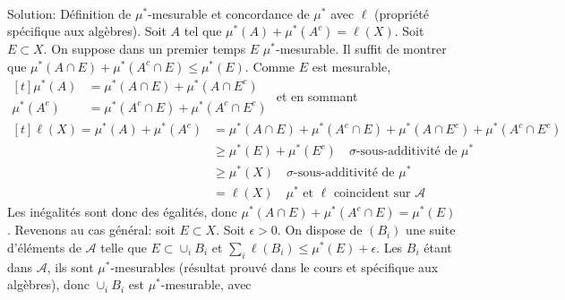\documentclass{report}
\begin{document}
\newpage 
\subsection{} \\ \\

Solution:\newline
\fbox{$\Rightarrow$} Définition de $\mu^*$-mesurable et concordance de $\mu^*$ avec $\ell$ (propriété spécifique aux algèbres).\newline
\fbox{$\Leftarrow$}  Soit $A$ tel que $\mu^*(A)+\mu^*(A^c) = \ell(X)$. \newline
Soit $E\subset X$. On suppose dans un premier temps $E$  $\mu^*$-mesurable. Il suffit de montrer que  $\mu^*(A\cap E) + \mu^*(A^c\cap E) \leq \mu^*(E)$.\newline
Comme $E$ est mesurable, $\begin{aligned}[t] \mu^*(A) &= \mu^*(A\cap E)+\mu^*(A\cap E^c) \\ 
\mu^*(A^c) &= \mu^*(A^c\cap E)+\mu^*(A^c\cap E^c)\end{aligned}$\newline \newline
et en sommant $\begin{aligned}[t]\ell(X)=\mu^*(A)+\mu^*(A^c) &= \mu^*(A\cap E)+\mu^*(A^c\cap E)+\mu^*(A\cap E^c)+\mu^*(A^c\cap E^c) \\
&\geq \mu^*(E) + \mu^*(E^c) \quad \text{$\sigma$-sous-additivité de $\mu^*$} \\
&\geq \mu^*(X) \quad \text{$\sigma$-sous-additivité de $\mu^*$} \\
&= \ell(X) \quad \text{$\mu^*$ et $\ell$ coincident sur $\mathcal A$} \end{aligned} $\newline \newline
Les inégalités sont donc des égalités, donc  $\mu^*(A\cap E) + \mu^*(A^c\cap E) = \mu^*(E)$.\newline 
\newline
Revenons au cas général: soit $E\subset X$.  Soit $\epsilon >0$. On dispose de $(B_i)$ une suite d'éléments de $\mathcal A$ telle que $E\subset \cup_i B_i$ et $\sum_i \ell(B_i)\leq \mu^*(E) + \epsilon$. \newline Les $B_i$ étant dans $\mathcal A$, ils sont $\mu^*$-mesurables (résultat prouvé dans le cours et spécifique aux algèbres), donc $\cup_i B_i$ est $\mu^*$-mesurable, avec \newline 
\end{document}

